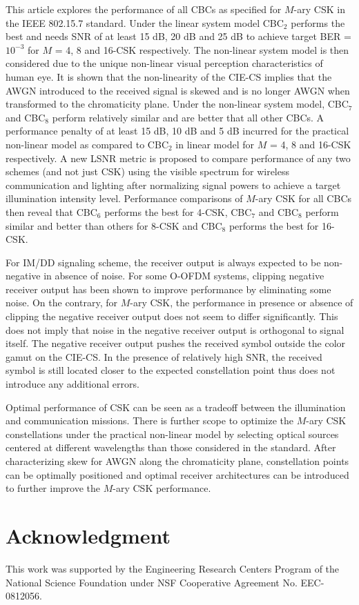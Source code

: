 \documentclass[10pt,letterpaper]{article}
\begin{document}
This article explores the performance of all CBCs as specified for $M$-ary CSK in the IEEE 802.15.7 standard. Under the linear system model CBC$_{2}$
performs the best and needs SNR of at least 15 dB, 20 dB and 25 dB to
achieve target BER = $10^{-3}$ for $M$ = 4, 8 and 16-CSK respectively. The
non-linear system model is then considered due to the unique non-linear visual perception characteristics of human eye. It is shown that the
non-linearity of the CIE-CS implies that the AWGN
introduced to the received signal is skewed and is no longer AWGN
when transformed to the chromaticity plane. Under the non-linear
system model, CBC$_{7}$ and CBC$_{8}$ perform relatively similar and are better that all other CBCs. A performance penalty
of at least 15 dB, 10 dB and 5 dB incurred for the practical non-linear model as compared to CBC$_{2}$ in linear model for
$M$ = 4, 8 and 16-CSK respectively. A new LSNR metric is proposed
to compare performance of any two schemes (and not just CSK) using the visible
spectrum for wireless communication and lighting after normalizing signal powers to achieve a target illumination intensity level. Performance comparisons of $M$-ary CSK for all CBCs then reveal that CBC$_{6}$ performs the best for
4-CSK, CBC$_{7}$ and CBC$_{8}$ perform similar and better than others for 8-CSK and CBC$_{8}$ performs the best for 16-CSK. 

For IM/DD signaling scheme, the receiver output is always expected to be non-negative in absence of noise. For some O-OFDM systems, clipping negative receiver output has been shown to improve performance by eliminating some noise. On the contrary, for $M$-ary CSK, the performance in presence or absence of clipping the negative receiver output does not seem to differ significantly. This does not imply that noise in the negative receiver output is orthogonal to signal itself. The negative receiver output pushes the received symbol outside the color gamut on the CIE-CS. In the presence of relatively high SNR, the received symbol is still located closer to the expected constellation point thus does not introduce any additional errors.

Optimal performance of CSK can be seen as a tradeoff between the
illumination and communication missions. There is further scope to
optimize the $M$-ary CSK constellations under the practical non-linear
model by selecting optical sources centered at different wavelengths
than those considered in the standard. After characterizing skew for
AWGN along the chromaticity plane, constellation points can be
optimally positioned and optimal receiver architectures can be introduced to further improve the $M$-ary CSK performance.

\section*{Acknowledgment}
This work was supported by the Engineering Research Centers Program of the National Science Foundation under NSF Cooperative Agreement No. EEC-0812056.
\end{document}
